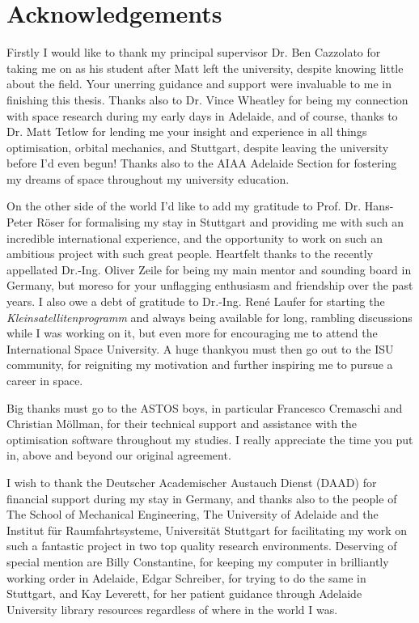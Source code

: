 \chapter*{Acknowledgements}

Firstly I would like to thank my principal supervisor Dr. Ben Cazzolato for taking me on as his student after Matt left the university, despite knowing little about the field. Your unerring guidance and support were invaluable to me in finishing this thesis. Thanks also to Dr. Vince Wheatley for being my connection with space research during my early days in Adelaide, and of course, thanks to Dr. Matt Tetlow for lending me your insight and experience in all things optimisation, orbital mechanics, and Stuttgart, despite leaving the university before I'd even begun! Thanks also to the AIAA Adelaide Section for fostering my dreams of space throughout my university education.

On the other side of the world I'd like to add my gratitude to Prof. Dr. Hans-Peter R\"{o}ser for formalising my stay in Stuttgart and providing me with such an incredible international experience, and the opportunity to work on such an ambitious project with such great people. Heartfelt thanks to the recently appellated Dr.-Ing. Oliver Zeile for being my main mentor and sounding board in Germany, but moreso for your unflagging enthusiasm and friendship over the past years. I also owe a debt of gratitude to Dr.-Ing. Ren\'{e} Laufer for starting the \emph{Kleinsatellitenprogramm} and always being available for long, rambling discussions while I was working on it, but even more for encouraging me to attend the International Space University. A huge thankyou must then go out to the ISU community, for reigniting my motivation and further inspiring me to pursue a career in space.

Big thanks must go to the ASTOS boys, in particular Francesco Cremaschi and Christian M\"{o}llman, for their technical support and assistance with the optimisation software throughout my studies. I really appreciate the time you put in, above and beyond our original agreement.

I wish to thank the Deutscher Academischer Austauch Dienst (DAAD) for financial support during my stay in Germany, and thanks also to the people of The School of Mechanical Engineering, The University of Adelaide and the Institut f\"{u}r Raumfahrtsysteme, Universit\"{a}t Stuttgart for facilitating my work on such a fantastic project in two top quality research environments. Deserving of special mention are Billy Constantine, for keeping my computer in brilliantly working order in Adelaide, Edgar Schreiber, for trying to do the same in Stuttgart, and Kay Leverett, for her patient guidance through Adelaide University library resources regardless of where in the world I was.

